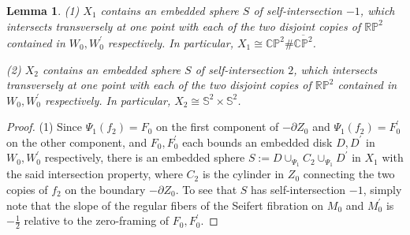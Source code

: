 \documentclass[11pt]{amsart}
\theoremstyle{plain}
\numberwithin{theorem}{section}
\newtheorem{lemma}[theorem]{Lemma}
\theoremstyle{definition}
\newcommand{\C}{{\mathbb C}}
\newcommand{\R}{{\mathbb R}}
\renewcommand{\P}{{\mathbb P}}
\newcommand{\s}{{\mathbb S}}
\begin{document}
\begin{lemma}
(1) $X_1$ contains an embedded sphere $S$ of self-intersection $-1$, which intersects transversely at one point with each of the two disjoint copies of $\R\P^2$ contained in $W_0, W_0^\prime$ respectively. In particular, 
$X_1\cong \C\P^2\# \overline{\C\P^2}$.

(2) $X_2$ contains an embedded sphere $S$ of self-intersection $2$,  which intersects transversely at one point with each of the two disjoint copies of $\R\P^2$ contained in $W_0, W_0^\prime$ respectively. In particular, 
$X_2\cong \s^2\times \s^2$.
\end{lemma}

\begin{proof}
(1) Since $\Psi_1(f_2)=F_0$ on the first component of $-\partial Z_0$ and $\Psi_1(f_2)=F_0^\prime$
on the other component, and $F_0,F_0^\prime$ each bounds an embedded disk $D, D^\prime$ in $W_0, W_0^\prime$ respectively, there is an embedded sphere $S:=D\cup_{\Psi_1} C_2\cup_{\Psi_1} D^\prime$ in $X_1$ with the said intersection property, where $C_2$ is the cylinder in $Z_0$ connecting the two copies of $f_2$ on the boundary $-\partial Z_0$. To see that $S$ has self-intersection $-1$, simply note that the slope of the regular fibers of the Seifert fibration on $M_0$ and $M_0^\prime$ is $-\frac{1}{2}$ relative to the zero-framing of $F_0,F_0^\prime$. 


\end{proof}
\end{document}

